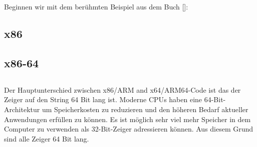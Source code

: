 \section{\HelloWorldSectionName}
\label{sec:helloworld}

Beginnen wir mit dem berühmten Beispiel aus dem Buch [\KRBook]:



\subsection{x86}





\subsection{x86-64}








\subsection{\Conclusion{}}

Der Hauptunterschied zwischen x86/ARM and x64/ARM64-Code ist das der Zeiger auf den String 64 Bit lang ist.
Moderne \ac{CPU}s haben eine 64-Bit-Architektur um Speicherkosten zu reduzieren und den höheren Bedarf
aktueller Anwendungen erfüllen zu können.
Es ist möglich sehr viel mehr Speicher in dem Computer zu verwenden als 32-Bit-Zeiger adressieren können.
Aus diesem Grund sind alle Zeiger 64 Bit lang.




